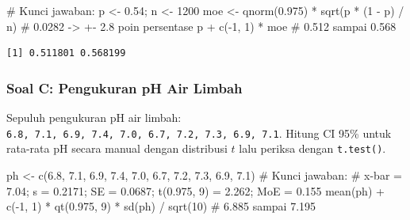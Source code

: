 \documentclass[
  indonesian,
  letterpaper,
]{book}
\newenvironment{Shaded}{\begin{snugshade}}{\end{snugshade}}
\newcommand{\CommentTok}[1]{\textcolor[rgb]{0.37,0.37,0.37}{#1}}
\newcommand{\DecValTok}[1]{\textcolor[rgb]{0.68,0.00,0.00}{#1}}
\newcommand{\FloatTok}[1]{\textcolor[rgb]{0.68,0.00,0.00}{#1}}
\newcommand{\FunctionTok}[1]{\textcolor[rgb]{0.28,0.35,0.67}{#1}}
\newcommand{\NormalTok}[1]{\textcolor[rgb]{0.00,0.23,0.31}{#1}}
\newcommand{\OtherTok}[1]{\textcolor[rgb]{0.00,0.23,0.31}{#1}}
\newcommand{\SpecialCharTok}[1]{\textcolor[rgb]{0.37,0.37,0.37}{#1}}
\begin{document}
\begin{Shaded}
\begin{Highlighting}[]
\CommentTok{\# Kunci jawaban:}
\NormalTok{p }\OtherTok{\textless{}{-}} \FloatTok{0.54}\NormalTok{; n }\OtherTok{\textless{}{-}} \DecValTok{1200}
\NormalTok{moe }\OtherTok{\textless{}{-}} \FunctionTok{qnorm}\NormalTok{(}\FloatTok{0.975}\NormalTok{) }\SpecialCharTok{*} \FunctionTok{sqrt}\NormalTok{(p }\SpecialCharTok{*}\NormalTok{ (}\DecValTok{1} \SpecialCharTok{{-}}\NormalTok{ p) }\SpecialCharTok{/}\NormalTok{ n) }\CommentTok{\# 0.0282 {-}\textgreater{} +{-} 2.8 poin persentase}
\NormalTok{p }\SpecialCharTok{+} \FunctionTok{c}\NormalTok{(}\SpecialCharTok{{-}}\DecValTok{1}\NormalTok{, }\DecValTok{1}\NormalTok{) }\SpecialCharTok{*}\NormalTok{ moe }\CommentTok{\# 0.512 sampai 0.568}
\end{Highlighting}
\end{Shaded}

\begin{verbatim}
[1] 0.511801 0.568199
\end{verbatim}

\subsubsection{Soal C: Pengukuran pH Air
Limbah}\label{soal-c-pengukuran-ph-air-limbah}

Sepuluh pengukuran pH air limbah:
\texttt{6.8,\ 7.1,\ 6.9,\ 7.4,\ 7.0,\ 6.7,\ 7.2,\ 7.3,\ 6.9,\ 7.1}.
Hitung CI 95\% untuk rata-rata pH secara manual dengan distribusi \(t\)
lalu periksa dengan \texttt{t.test()}.

\begin{Shaded}
\begin{Highlighting}[]
\NormalTok{ph }\OtherTok{\textless{}{-}} \FunctionTok{c}\NormalTok{(}\FloatTok{6.8}\NormalTok{, }\FloatTok{7.1}\NormalTok{, }\FloatTok{6.9}\NormalTok{, }\FloatTok{7.4}\NormalTok{, }\FloatTok{7.0}\NormalTok{, }\FloatTok{6.7}\NormalTok{, }\FloatTok{7.2}\NormalTok{, }\FloatTok{7.3}\NormalTok{, }\FloatTok{6.9}\NormalTok{, }\FloatTok{7.1}\NormalTok{)}
\CommentTok{\# Kunci jawaban:}
\CommentTok{\# x{-}bar = 7.04; s = 0.2171; SE = 0.0687; t(0.975, 9) = 2.262; MoE = 0.155}
\FunctionTok{mean}\NormalTok{(ph) }\SpecialCharTok{+} \FunctionTok{c}\NormalTok{(}\SpecialCharTok{{-}}\DecValTok{1}\NormalTok{, }\DecValTok{1}\NormalTok{) }\SpecialCharTok{*} \FunctionTok{qt}\NormalTok{(}\FloatTok{0.975}\NormalTok{, }\DecValTok{9}\NormalTok{) }\SpecialCharTok{*} \FunctionTok{sd}\NormalTok{(ph) }\SpecialCharTok{/} \FunctionTok{sqrt}\NormalTok{(}\DecValTok{10}\NormalTok{) }\CommentTok{\# 6.885 sampai 7.195}
\end{Highlighting}
\end{Shaded}
\end{document}
